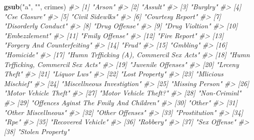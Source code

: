 \documentclass[
  12pt,
]{book}
\newenvironment{Shaded}{\begin{snugshade}}{\end{snugshade}}
\newcommand{\CommentTok}[1]{\textcolor[rgb]{0.37,0.37,0.37}{\textit{#1}}}
\newcommand{\KeywordTok}[1]{\textcolor[rgb]{0.27,0.27,0.27}{\textbf{#1}}}
\newcommand{\NormalTok}[1]{#1}
\newcommand{\StringTok}[1]{\textcolor[rgb]{0.5,0.5,0.5}{#1}}
\begin{document}
\begin{Shaded}
\begin{Highlighting}[]
\KeywordTok{gsub}\NormalTok{(}\StringTok{"a"}\NormalTok{, }\StringTok{""}\NormalTok{, crimes)}
\CommentTok{\#>  [1] "Arson"                                  }
\CommentTok{\#>  [2] "Assult"                                 }
\CommentTok{\#>  [3] "Burglry"                                }
\CommentTok{\#>  [4] "Cse Closure"                            }
\CommentTok{\#>  [5] "Civil Sidewlks"                         }
\CommentTok{\#>  [6] "Courtesy Report"                        }
\CommentTok{\#>  [7] "Disorderly Conduct"                     }
\CommentTok{\#>  [8] "Drug Offense"                           }
\CommentTok{\#>  [9] "Drug Violtion"                          }
\CommentTok{\#> [10] "Embezzlement"                           }
\CommentTok{\#> [11] "Fmily Offense"                          }
\CommentTok{\#> [12] "Fire Report"                            }
\CommentTok{\#> [13] "Forgery And Counterfeiting"             }
\CommentTok{\#> [14] "Frud"                                   }
\CommentTok{\#> [15] "Gmbling"                                }
\CommentTok{\#> [16] "Homicide"                               }
\CommentTok{\#> [17] "Humn Trfficking (A), Commercil Sex Acts"}
\CommentTok{\#> [18] "Humn Trfficking, Commercil Sex Acts"    }
\CommentTok{\#> [19] "Juvenile Offenses"                      }
\CommentTok{\#> [20] "Lrceny Theft"                           }
\CommentTok{\#> [21] "Liquor Lws"                             }
\CommentTok{\#> [22] "Lost Property"                          }
\CommentTok{\#> [23] "Mlicious Mischief"                      }
\CommentTok{\#> [24] "Miscellneous Investigtion"              }
\CommentTok{\#> [25] "Missing Person"                         }
\CommentTok{\#> [26] "Motor Vehicle Theft"                    }
\CommentTok{\#> [27] "Motor Vehicle Theft?"                   }
\CommentTok{\#> [28] "Non{-}Criminl"                            }
\CommentTok{\#> [29] "Offences Aginst The Fmily And Children" }
\CommentTok{\#> [30] "Other"                                  }
\CommentTok{\#> [31] "Other Miscellneous"                     }
\CommentTok{\#> [32] "Other Offenses"                         }
\CommentTok{\#> [33] "Prostitution"                           }
\CommentTok{\#> [34] "Rpe"                                    }
\CommentTok{\#> [35] "Recovered Vehicle"                      }
\CommentTok{\#> [36] "Robbery"                                }
\CommentTok{\#> [37] "Sex Offense"                            }
\CommentTok{\#> [38] "Stolen Property"                        }

\end{Highlighting}
\end{Shaded}
\end{document}
